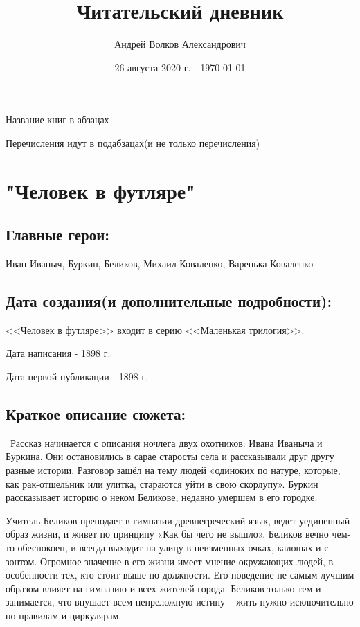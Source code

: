 \documentclass[a4paper,12pt]{article}
\author{Андрей Волков Александрович}
\title{Читательский дневник}
\date{26 августа 2020 г. - \today }
\begin{document}
	\maketitle
	Название книг в абзацах
	
	Перечисления идут в подабзацах(и не только перечисления)
	\section{"Человек в футляре"}
	\subsection{Главные герои: }
	Иван Иваныч, Буркин, Беликов, Михаил Коваленко, Варенька Коваленко 
	\subsection{Дата создания(и дополнительные подробности): }
	\maketitle
	<<Человек в футляре>> входит в серию <<Маленькая трилогия>>.
	
	\noindent
	Дата написания - 1898 г.
	
	\noindent
	Дата первой публикации - 1898 г.
	
	\subsection{Краткое описание сюжета: }
	\quad \, Рассказ начинается с описания ночлега двух охотников: Ивана Иваныча и Буркина. Они остановились в сарае старосты села и рассказывали друг другу разные истории. Разговор зашёл на тему людей «одиноких по натуре, которые, как рак-отшельник или улитка, стараются уйти в свою скорлупу». Буркин рассказывает историю о неком Беликове, недавно умершем в его городке. 
	
	Учитель Беликов преподает в гимназии древнегреческий язык, ведет уединенный образ жизни, и живет по принципу «Как бы чего не вышло».  Беликов вечно чем-то обеспокоен, и всегда выходит на улицу в неизменных очках, калошах и с зонтом. Огромное значение в его жизни имеет мнение окружающих людей, в особенности тех, кто стоит выше по должности. Его поведение не самым лучшим образом влияет на гимназию и всех жителей города. Беликов только тем и занимается, что внушает всем непреложную истину – жить нужно исключительно по правилам и циркулярам.
\end{document}
